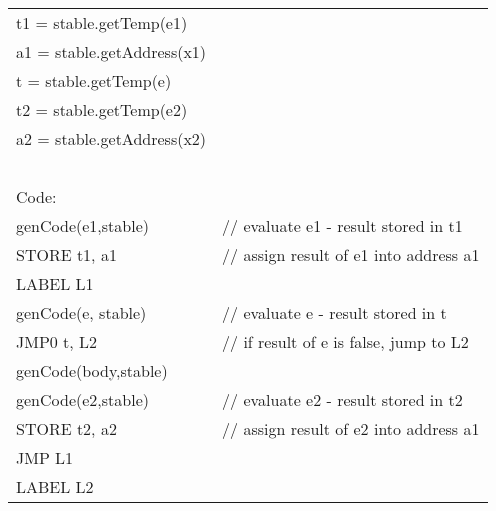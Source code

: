 \documentclass{article}
\begin{document}
\begin{itemize}
\begin{tabular}{ll}
t1 = stable.getTemp(e1) & \\
a1 = stable.getAddress(x1) & \\
t = stable.getTemp(e) & \\
t2 = stable.getTemp(e2) & \\
a2 = stable.getAddress(x2) & \\
\ \\
Code: & \\
genCode(e1,stable) & //  evaluate e1 - result stored in t1  \\
STORE t1, a1    &  // assign result of e1 into address a1 \\
LABEL L1  & \\
genCode(e, stable) & // evaluate e - result stored in t\\
JMP0 t, L2   & // if result of e is false, jump to L2   \\
genCode(body,stable) &  \\
genCode(e2,stable)  & // evaluate e2 - result stored in t2 \\
STORE t2, a2       &  // assign result of e2 into address a1 \\
JMP L1  &  \\
LABEL L2 &  \\
\end{tabular}

\end{itemize}
\end{document}
